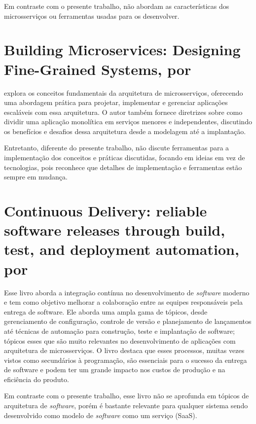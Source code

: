 Em contraste com o presente trabalho,  não abordam as características dos microsserviços ou ferramentas usadas para os desenvolver.

\section{Building Microservices: Designing Fine-Grained Systems, por \texorpdfstring{}{Newman (2015)}}

 explora os conceitos fundamentais da arquitetura de microsserviços, oferecendo uma abordagem prática para projetar, implementar e gerenciar aplicações escaláveis com essa arquitetura. O autor também fornece diretrizes sobre como dividir uma aplicação monolítica em serviços menores e independentes, discutindo os benefícios e desafios dessa arquitetura desde a modelagem até a implantação.

Entretanto, diferente do presente trabalho,  não discute ferramentas para a implementação dos conceitos e práticas discutidas, focando em ideias em vez de tecnologias, pois reconhece que detalhes de implementação e ferramentas estão sempre em mudança.

\section{Continuous Delivery: reliable software releases through build, test, and deployment automation, por \texorpdfstring{}{Humble e Farley (2010)}}
Esse livro aborda a integração contínua no desenvolvimento de \emph{software} moderno e tem como objetivo melhorar a colaboração entre as equipes responsáveis pela entrega de software. Ele aborda uma ampla gama de tópicos, desde gerenciamento de configuração, controle de versão e planejamento de lançamentos até técnicas de automação para construção, teste e implantação de software; tópicos esses que são muito relevantes no desenvolvimento de aplicações com arquitetura de microsserviços. O livro destaca que esses processos, muitas vezes vistos como secundários à programação, são essenciais para o sucesso da entrega de software e podem ter um grande impacto nos custos de produção e na eficiência do produto.

Em contraste com o presente trabalho, esse livro não se aprofunda em tópicos de arquitetura de \emph{software}, porém é bastante relevante para qualquer sistema sendo desenvolvido como modelo de \emph{software} como um serviço (SaaS).

